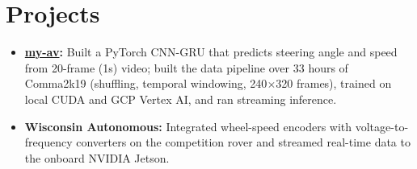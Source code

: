 \documentclass[11pt, letterpaper]{article}
\begin{document}
\section{Projects}
\begin{itemize}
  \item \textbf{\href{https://github.com/lordphone/my-av}{my-av}:} Built a PyTorch CNN-GRU that predicts steering angle and speed from 20-frame (1s) video; built the data pipeline over 33 hours of Comma2k19 (shuffling, temporal windowing, 240$\times$320 frames), trained on local CUDA and GCP Vertex AI, and ran streaming inference.
  \item \textbf{Wisconsin Autonomous:} Integrated wheel-speed encoders with voltage-to-frequency converters on the competition rover and streamed real-time data to the onboard NVIDIA Jetson.
\end{itemize}
\end{document}
